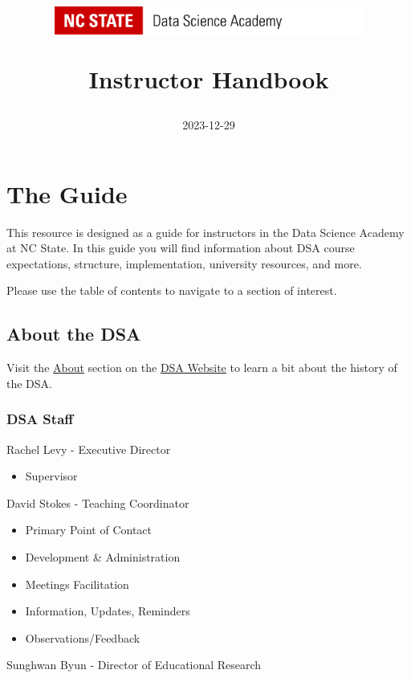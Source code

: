 \documentclass[
]{book}
\title{\includegraphics[width=4in,height=\textheight]{DSA Logo.png}

Instructor Handbook}
\author{2023-12-29}
\date{}
\providecommand{\tightlist}{%
  \setlength{\itemsep}{0pt}\setlength{\parskip}{0pt}}
\begin{document}
\maketitle

{
\setcounter{tocdepth}{1}
\tableofcontents
}
\hypertarget{the-guide}{%
\chapter{The Guide}\label{the-guide}}

This resource is designed as a guide for instructors in the Data Science Academy at NC State. In this guide you will find information about DSA course expectations, structure, implementation, university resources, and more.

Please use the table of contents to navigate to a section of interest.

\hypertarget{about-the-dsa}{%
\section{About the DSA}\label{about-the-dsa}}

Visit the \href{https://datascienceacademy.ncsu.edu/about/}{About} section on the \href{https://datascienceacademy.ncsu.edu/}{DSA Website} to learn a bit about the history of the DSA.

\hypertarget{dsa-staff}{%
\subsection{DSA Staff}\label{dsa-staff}}

Rachel Levy - Executive Director

\begin{itemize}
\tightlist
\item
  Supervisor
\end{itemize}

David Stokes - Teaching Coordinator

\begin{itemize}
\tightlist
\item
  Primary Point of Contact
\item
  Development \& Administration
\item
  Meetings Facilitation
\item
  Information, Updates, Reminders
\item
  Observations/Feedback
\end{itemize}

Sunghwan Byun - Director of Educational Research
\end{document}

